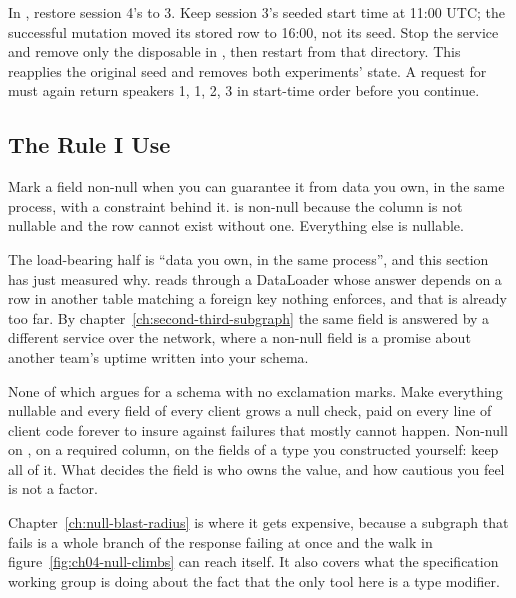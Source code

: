 In , restore session 4's  to 3.
Keep session 3's seeded start time at 11:00 UTC; the successful mutation
moved its stored row to 16:00, not its seed. Stop the service and remove only
the disposable  in , then restart
from that directory. This reapplies the original seed and removes both
experiments' state. A request for  must again
return speakers 1, 1, 2, 3 in start-time order before you continue.

\subsection{The Rule I Use}

%
Mark a field non-null when you can guarantee it from data you own, in the same
process, with a constraint behind it.  is non-null because
the column is not nullable and the row cannot exist without one. Everything
else is nullable.

%
The load-bearing half is \enquote{data you own, in the same process}, and this
section has just measured why.  reads through a DataLoader whose
answer depends on a row in another table matching a foreign key nothing
enforces, and that is already too far. By
chapter~\ref{ch:second-third-subgraph} the same field is answered by a
different service over the network, where a non-null field is a promise about
another team's uptime written into your schema.

%
None of which argues for a schema with no exclamation marks. Make everything
nullable and every field of every client grows a null check, paid on every
line of client code forever to insure against failures that mostly cannot
happen. Non-null on , on a required column, on the fields of a type
you constructed yourself: keep all of it. What decides the field is who owns
the value, and how cautious you feel is not a factor.

%
Chapter~\ref{ch:null-blast-radius} is where it gets expensive, because a
subgraph that fails is a whole branch of the response failing at once and the
walk in figure~\ref{fig:ch04-null-climbs} can reach  itself. It
also covers what the specification working group is doing about the fact that
the only tool here is a type modifier.
%
